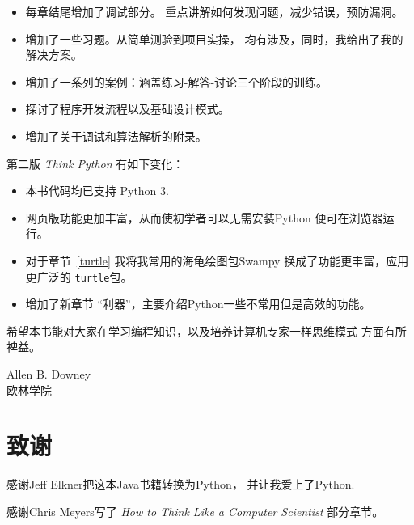 \documentclass[10pt]{book}
\begin{document}
\begin{itemize}

\item 每章结尾增加了调试部分。
重点讲解如何发现问题，减少错误，预防漏洞。

\item 增加了一些习题。从简单测验到项目实操， 
均有涉及，同时，我给出了我的解决方案。

\item 增加了一系列的案例：涵盖练习-解答-讨论三个阶段的训练。

\item 探讨了程序开发流程以及基础设计模式。

\item 增加了关于调试和算法解析的附录。

\end{itemize}

第二版 {\em Think Python} 有如下变化：

\begin{itemize}

\item 本书代码均已支持 Python 3.

\item 网页版功能更加丰富，从而使初学者可以无需安装Python
便可在浏览器运行。

\item 对于章节~\ref{turtle} 我将我常用的海龟绘图包Swampy
换成了功能更丰富，应用更广泛的 {\tt  turtle}包。

\item 增加了新章节 “利器”，主要介绍Python一些不常用但是高效的功能。

\end{itemize}

希望本书能对大家在学习编程知识，以及培养计算机专家一样思维模式
方面有所裨益。



Allen B. Downey \\

欧林学院 \\


\section*{致谢}

感谢Jeff Elkner把这本Java书籍转换为Python，
并让我爱上了Python.

感谢Chris Meyers写了 {\em How to Think Like a Computer Scientist} 部分章节。
\end{document}
